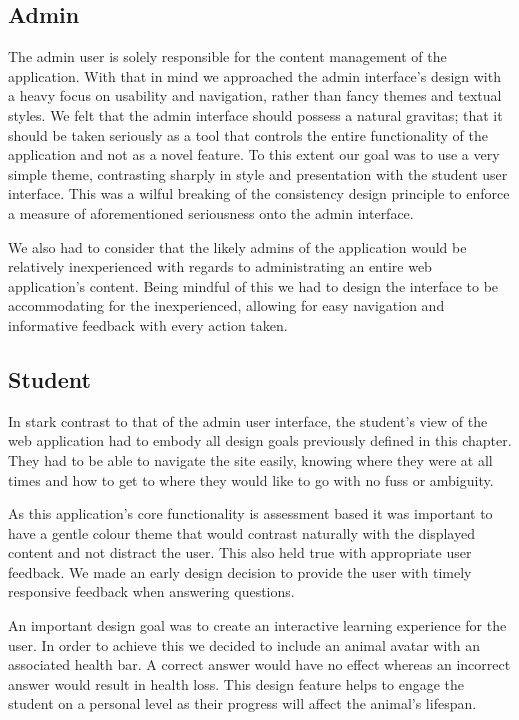\documentclass{l3proj}
\begin{document}
\subsection{Admin}

The admin user is solely responsible for the content management of the application. With that in mind we approached the admin interface's design with a heavy focus on usability and navigation, rather than fancy themes and textual styles. We felt that the admin interface should possess a natural gravitas; that it should be taken seriously as a tool that controls the entire functionality of the application and not as a novel feature. To this extent our goal was to use a very simple theme, contrasting sharply in style and presentation with the student user interface. This was a wilful breaking of the consistency design principle to enforce a measure of aforementioned seriousness onto the admin interface.

We also had to consider that the likely admins of the application would be relatively inexperienced with regards to administrating an entire web application's content. Being mindful of this we had to design the interface to be accommodating for the inexperienced, allowing for easy navigation and informative feedback with every action taken.

\subsection{Student}

In stark contrast to that of the admin user interface, the student's view of the web application had to embody all design goals previously defined in this chapter. They had to be able to navigate the site easily, knowing where they were at all times and how to get to where they would like to go with no fuss or ambiguity.

As this application's core functionality is assessment based it was important to have a gentle colour theme that would contrast naturally with the displayed content and not distract the user. This also held true with appropriate user feedback. We made an early design decision to provide the user with timely responsive feedback when answering questions.

An important design goal was to create an interactive learning experience for the user. In order to achieve this we decided to include an animal avatar with an associated health bar. A correct answer would have no effect whereas an incorrect answer would result in health loss. This design feature helps to engage the student on a personal level as their progress will affect the animal's lifespan. 
\end{document}
